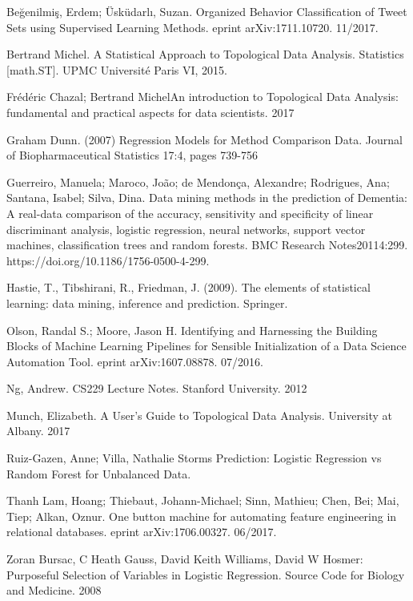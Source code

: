 \documentclass{llncs}
\begin{document}
\newpage
\begin{thebibliography}{9}

Beğenilmiş, Erdem; Üsküdarlı, Suzan.  Organized Behavior Classification of Tweet Sets using Supervised Learning Methods. eprint arXiv:1711.10720. 11/2017.

Bertrand Michel. A Statistical Approach to Topological Data Analysis. Statistics [math.ST]. UPMC Université Paris VI, 2015.

Frédéric Chazal; Bertrand MichelAn introduction to Topological Data Analysis: fundamental and practical aspects for data scientists. 2017

Graham Dunn. (2007) Regression Models for Method Comparison Data. Journal of Biopharmaceutical Statistics 17:4, pages 739-756

Guerreiro, Manuela; Maroco, João; de Mendonça, Alexandre; Rodrigues, Ana; Santana, Isabel; Silva, Dina. Data mining methods in the prediction of Dementia: A real-data comparison of the accuracy, sensitivity and specificity of linear discriminant analysis, logistic regression, neural networks, support vector machines, classification trees and random forests. BMC Research Notes20114:299. https://doi.org/10.1186/1756-0500-4-299.

Hastie, T., Tibshirani, R., Friedman, J. (2009). The elements of statistical learning: data mining, inference and prediction. Springer. 

Olson, Randal S.; Moore, Jason H.  Identifying and Harnessing the Building Blocks of Machine Learning Pipelines for Sensible Initialization of a Data Science Automation Tool. eprint arXiv:1607.08878. 07/2016. 

Ng, Andrew. CS229 Lecture Notes. Stanford University. 2012

Munch, Elizabeth. A User’s Guide to Topological Data Analysis. University at Albany. 2017

Ruiz-Gazen, Anne; Villa, Nathalie Storms Prediction: Logistic Regression vs Random Forest for Unbalanced Data.

Thanh Lam, Hoang; Thiebaut, Johann-Michael; Sinn, Mathieu; Chen, Bei; Mai, Tiep; Alkan, Oznur.  One button machine for automating feature engineering in relational databases. eprint arXiv:1706.00327. 06/2017.

Zoran Bursac, C Heath Gauss, David Keith Williams, David W Hosmer: Purposeful Selection of Variables in Logistic Regression. Source Code for Biology and Medicine. 2008

\end{thebibliography}
\end{document}
